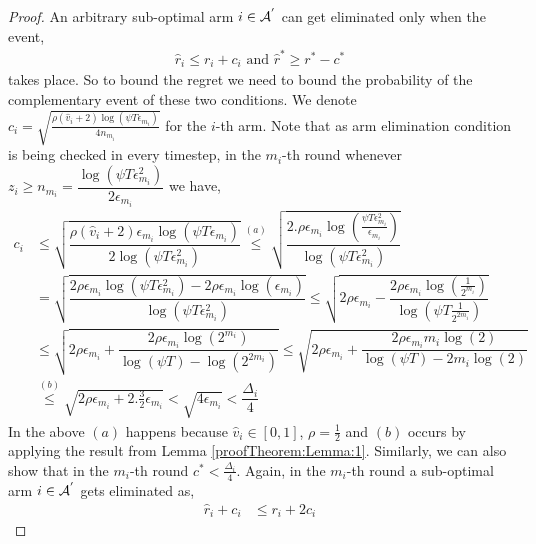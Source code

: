 \begin{proof}
An arbitrary sub-optimal arm ${i}\in \mathcal{A}^{'}$ can get eliminated only when the event,
	\begin{align}
	\hat{r}_{i} \leq r_{i} + c_{i} \text{ and } \label{eq:armelim-casea}
 	\hat{r}^{*} \geq r^{*} - c^{*}
	\end{align}
takes place. So to bound the regret we need to bound the probability of the complementary event of these two conditions. We denote $c_{i} = \sqrt{\frac{\rho (\hat{v}_i + 2) \log (\psi T\epsilon_{m_{i}})}{4 n_{m_i}}}$ for the $i$-th arm. Note that as arm elimination condition is being checked in every timestep, in the $m_i$-th round whenever $z_i \geq n_{m_{i}}=\dfrac{\log{(\psi T\epsilon_{m_{i}}^{2})}}{2\epsilon_{m_{i}}}$ we have, 
	\begin{align*}
	c_{i} &\leq \sqrt{\dfrac{\rho (\hat{v}_i + 2)\epsilon_{m_{i}}\log (\psi T\epsilon_{m_{i}})}{2\log(\psi T\epsilon_{m_{i}}^{2})}} \overset{(a)}{\leq} \sqrt{\dfrac{2.\rho\epsilon_{m_{i}}\log (\frac{\psi T\epsilon_{m_{i}}^{2}}{\epsilon_{m_{i}}})}{\log(\psi T\epsilon_{m_{i}}^{2})}} \\
	& = \sqrt{\dfrac{2\rho\epsilon_{m_{i}}\log (\psi T\epsilon_{m_{i}}^{2}) - 2\rho\epsilon_{m_{i}}\log (\epsilon_{m_{i}})}{\log(\psi T\epsilon_{m_{i}}^{2})}} 
	\leq  \sqrt{2\rho\epsilon_{m_{i}} - \dfrac{2\rho\epsilon_{m_i}\log(\frac{1}{2^{m_i}})}{\log(\psi T \frac{1}{2^{2m_i}})}} \\
	&\leq \sqrt{2\rho\epsilon_{m_{i}} + \dfrac{2\rho\epsilon_{m_i}\log(2^{m_i})}{\log(\psi T) - \log( 2^{2m_i})}}  \leq \sqrt{2\rho\epsilon_{m_{i}} + \dfrac{2\rho\epsilon_{m_i}m_i \log(2)}{\log(\psi T) - 2m_i\log( 2)}} \\ 
	 & \overset{(b)}{\leq} \sqrt{2\rho\epsilon_{m_{i}} + 2.\frac{3}{2}\epsilon_{m_i}} 
	  < \sqrt{4\epsilon_{m_i}} 
	  < \dfrac{\Delta_{i}}{4} 
	\end{align*}
In the above $(a)$ happens because $\hat{v}_i \in [0,1]$, $\rho =\frac{1}{2}$ and $(b)$ occurs by applying the result from Lemma \ref{proofTheorem:Lemma:1}. Similarly, we can also show that in the $m_i$-th round $c^* < \frac{\Delta_i}{4}$.
Again, in the $m_i$-th round a sub-optimal arm ${i} \in \mathcal{A}^{'}$ gets eliminated as, 
  \begin{align*}
\hat{r}_{i} + c_{i}&\leq r_{i} + 2c_{i} 

\end{align*}
\end{proof}
